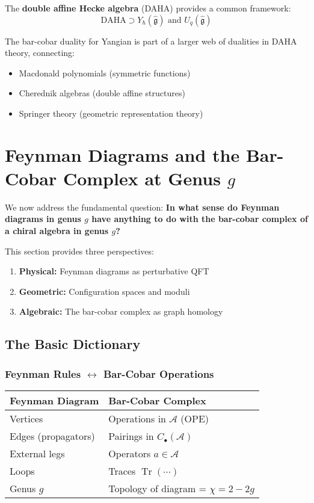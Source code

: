 \begin{remark}
The \textbf{double affine Hecke algebra} (DAHA) provides a common framework:
$$\text{DAHA} \supset Y_{\hbar}(\widehat{\mathfrak{g}}) \text{ and } U_q(\widehat{\mathfrak{g}})$$

The bar-cobar duality for Yangian is part of a larger web of dualities in DAHA 
theory, connecting:
\begin{itemize}
\item Macdonald polynomials (symmetric functions)
\item Cherednik algebras (double affine structures)
\item Springer theory (geometric representation theory)
\end{itemize}
\end{remark}

\section{Feynman Diagrams and the Bar-Cobar Complex at Genus $g$}
\label{sec:feynman_genus_g}

We now address the fundamental question: \textbf{In what sense do Feynman diagrams
in genus $g$ have anything to do with the bar-cobar complex of a chiral algebra in
genus $g$?}

This section provides three perspectives:
\begin{enumerate}
\item \textbf{Physical:} Feynman diagrams as perturbative QFT
\item \textbf{Geometric:} Configuration spaces and moduli
\item \textbf{Algebraic:} The bar-cobar complex as graph homology
\end{enumerate}

\subsection{The Basic Dictionary}

\subsubsection{Feynman Rules $\leftrightarrow$ Bar-Cobar Operations}

\begin{center}
\begin{tabular}{|l|l|}
\hline
\textbf{Feynman Diagram} & \textbf{Bar-Cobar Complex} \\
\hline
Vertices & Operations in $\mathcal{A}$ (OPE) \\
Edges (propagators) & Pairings in $C_{\bullet}(\mathcal{A})$ \\
External legs & Operators $a \in \mathcal{A}$ \\
Loops & Traces $\operatorname{Tr}(\cdots)$ \\
Genus $g$ & Topology of diagram = $\chi = 2-2g$ \\
\hline
\end{tabular}
\end{center}

